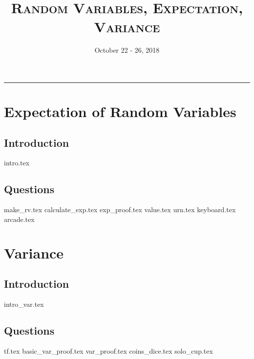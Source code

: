 \documentclass{exam}
\title{\textsc{Random Variables, Expectation, Variance}}
\date{October 22 - 26, 2018}
\begin{document}
\maketitle
\rule{\textwidth}{0.15em}
\fontsize{12}{15}\selectfont
\thispagestyle{empty}


\section{Expectation of Random Variables}
\subsection{Introduction}
{intro.tex}
\subsection{Questions}
\begin{questions}
{make_rv.tex}
{calculate_exp.tex}
{exp_proof.tex}
{value.tex}
{urn.tex}
{keyboard.tex}
{arcade.tex}
\end{questions}
\section{Variance}
\subsection{Introduction}
{intro_var.tex}
\subsection{Questions}
\begin{questions}
{tf.tex}
{basic_var_proof.tex}
{var_proof.tex}
{coins_dice.tex}
{solo_cup.tex}
\end{questions}

\end{document}
